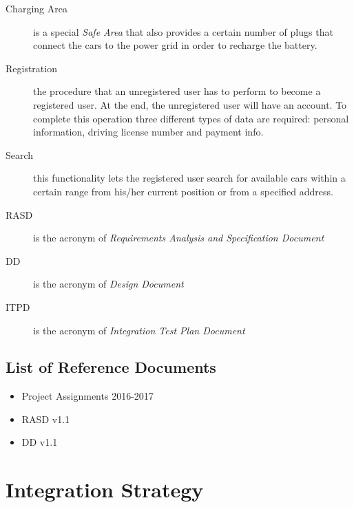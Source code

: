 \documentclass[11pt,a4paper]{report}
\begin{document}
\begin{description}
	\item[Charging Area] is a special \textit{Safe Area} that also provides a certain number of plugs that connect the cars to the power grid in order to recharge the battery.
	\item[Registration] the procedure that an unregistered user has to perform to become a registered user. At the end, the unregistered user will have an account. To complete this operation three different types of data are required: personal information, driving license number and payment info.
	\item[Search] this functionality lets the registered user search for available cars within a certain range from his/her current position or from a specified address.
	\item[RASD] is the acronym of \textit{Requirements Analysis and Specification Document}
	\item[DD] is the acronym of \textit{Design Document}
	\item[ITPD] is the acronym of \textit{Integration Test Plan Document}
\end{description}
\section{List of Reference Documents}
	\begin{itemize}
		\item Project Assignments 2016-2017
		\item RASD v1.1
		\item DD v1.1
	\end{itemize}
\chapter{Integration Strategy}
\end{document}
